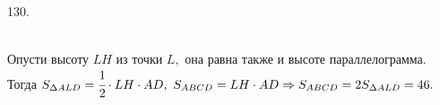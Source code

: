 130. \begin{figure}[ht!]
\end{figure}\\
Опусти высоту $LH$ из точки $L,$ она равна также и высоте параллелограмма. Тогда $S_{\Delta ALD}=\cfrac{1}{2}\cdot LH\cdot AD,\ S_{ABCD}=LH\cdot AD\Rightarrow
S_{ABCD}=2S_{\Delta ALD}=46.$\newpage\noindent
